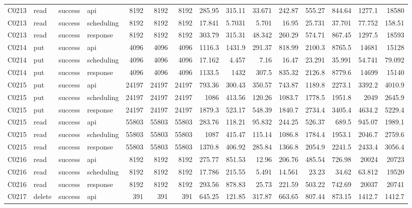 \begin{landscape}
\begin{longtable}{llllrrrrrrrrrrr}
C0213 & read & success & api & 8192 & 8192 & 8192 & 285.95 & 315.11 & 33.671 & 242.87 & 555.27 & 844.64 & 1277.1 & 18580\\
C0213 & read & success & scheduling & 8192 & 8192 & 8192 & 17.841 & 5.7031 & 5.701 & 16.95 & 25.731 & 37.701 & 77.752 & 158.51\\
C0213 & read & success & response & 8192 & 8192 & 8192 & 303.79 & 315.31 & 48.342 & 260.29 & 574.71 & 867.45 & 1297.5 & 18593\\
C0214 & put & success & api & 4096 & 4096 & 4096 & 1116.3 & 1431.9 & 291.37 & 818.99 & 2100.3 & 8765.5 & 14681 & 15128\\
C0214 & put & success & scheduling & 4096 & 4096 & 4096 & 17.162 & 4.457 & 7.16 & 16.47 & 23.291 & 35.991 & 54.741 & 79.092\\
C0214 & put & success & response & 4096 & 4096 & 4096 & 1133.5 & 1432 & 307.5 & 835.32 & 2126.8 & 8779.6 & 14699 & 15140\\
C0215 & put & success & api & 24197 & 24197 & 24197 & 793.36 & 300.43 & 350.57 & 743.87 & 1189.8 & 2273.1 & 3392.2 & 4010.9\\
C0215 & put & success & scheduling & 24197 & 24197 & 24197 & 1086 & 413.56 & 120.26 & 1083.7 & 1778.5 & 1951.8 & 2049 & 2645.9\\
C0215 & put & success & response & 24197 & 24197 & 24197 & 1879.3 & 523.17 & 548.39 & 1840.7 & 2734.4 & 3405.4 & 4634.2 & 5229.4\\
C0215 & read & success & api & 55803 & 55803 & 55803 & 283.76 & 118.21 & 95.832 & 244.25 & 526.37 & 689.5 & 945.07 & 1989.1\\
C0215 & read & success & scheduling & 55803 & 55803 & 55803 & 1087 & 415.47 & 115.14 & 1086.8 & 1784.4 & 1953.1 & 2046.7 & 2759.6\\
C0215 & read & success & response & 55803 & 55803 & 55803 & 1370.8 & 406.92 & 285.84 & 1366.8 & 2054.9 & 2241.5 & 2433.4 & 3056.4\\
C0216 & read & success & api & 8192 & 8192 & 8192 & 275.77 & 851.53 & 12.96 & 206.76 & 485.54 & 726.98 & 20024 & 20723\\
C0216 & read & success & scheduling & 8192 & 8192 & 8192 & 17.786 & 215.55 & 5.491 & 14.561 & 23.23 & 34.62 & 63.812 & 19520\\
C0216 & read & success & response & 8192 & 8192 & 8192 & 293.56 & 878.83 & 25.73 & 221.59 & 503.22 & 742.69 & 20037 & 20741\\
C0217 & delete & success & api & 391 & 391 & 391 & 645.25 & 121.85 & 317.87 & 663.65 & 807.44 & 873.15 & 1412.7 & 1412.7\\

\end{longtable}
\end{landscape}
